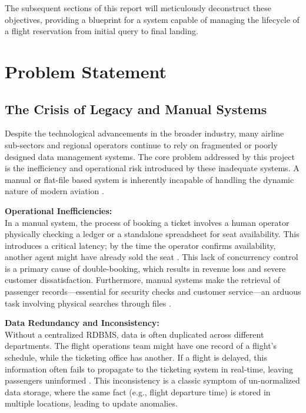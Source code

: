 \documentclass[12pt, a4paper]{article}
\begin{document}
	The subsequent sections of this report will meticulously deconstruct these objectives, providing a blueprint for a system capable of managing the lifecycle of a flight reservation from initial query to final landing.
	
	\newpage
	\section{Problem Statement}
	
	\subsection{The Crisis of Legacy and Manual Systems}
	Despite the technological advancements in the broader industry, many airline sub-sectors and regional operators continue to rely on fragmented or poorly designed data management systems. The core problem addressed by this project is the inefficiency and operational risk introduced by these inadequate systems. A manual or flat-file based system is inherently incapable of handling the dynamic nature of modern aviation \cite{ref17}.
	
	\noindent \textbf{Operational Inefficiencies:} \\
	In a manual system, the process of booking a ticket involves a human operator physically checking a ledger or a standalone spreadsheet for seat availability. This introduces a critical latency; by the time the operator confirms availability, another agent might have already sold the seat \cite{ref10}. This lack of concurrency control is a primary cause of double-booking, which results in revenue loss and severe customer dissatisfaction. Furthermore, manual systems make the retrieval of passenger records—essential for security checks and customer service—an arduous task involving physical searches through files \cite{ref11}.
	
	\noindent \textbf{Data Redundancy and Inconsistency:} \\
	Without a centralized RDBMS, data is often duplicated across different departments. The flight operations team might have one record of a flight's schedule, while the ticketing office has another. If a flight is delayed, this information often fails to propagate to the ticketing system in real-time, leaving passengers uninformed \cite{ref18}. This inconsistency is a classic symptom of un-normalized data storage, where the same fact (e.g., flight departure time) is stored in multiple locations, leading to update anomalies.
	
\end{document}
